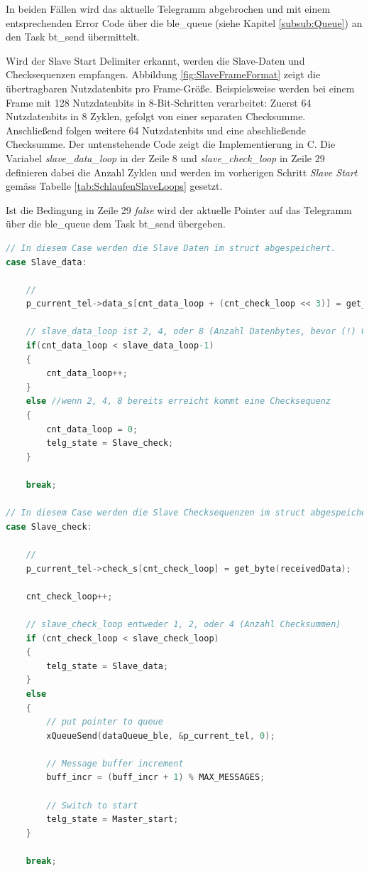 In beiden Fällen wird das aktuelle Telegramm abgebrochen und mit einem entsprechenden Error Code über die ble\_queue (siehe Kapitel \ref{subsub:Queue}) an den Task bt\_send übermittelt. 

Wird der Slave Start Delimiter erkannt, werden die Slave-Daten und Checksequenzen empfangen. Abbildung \ref{fig:SlaveFrameFormat} zeigt die übertragbaren Nutzdatenbits pro Frame-Größe. Beispielsweise werden bei einem Frame mit 128 Nutzdatenbits in 8-Bit-Schritten verarbeitet: Zuerst 64 Nutzdatenbits in 8 Zyklen, gefolgt von einer separaten Checksumme. Anschließend folgen weitere 64 Nutzdatenbits und eine abschließende Checksumme. Der untenstehende Code zeigt die Implementierung in C. Die Variabel \textit{slave\_data\_loop} in der Zeile 8 und \textit{slave\_check\_loop} in Zeile 29 definieren dabei die Anzahl Zyklen und werden im vorherigen Schritt \textit{Slave Start} gemäss Tabelle \ref{tab:SchlaufenSlaveLoops} gesetzt. 

Ist die Bedingung in Zeile 29 \textit{false} wird der aktuelle Pointer auf das Telegramm über die ble\_queue dem Task bt\_send übergeben. 


\begin{lstlisting}[language=C]
// In diesem Case werden die Slave Daten im struct abgespeichert.
case Slave_data:

    // 
    p_current_tel->data_s[cnt_data_loop + (cnt_check_loop << 3)] = get_byte(receivedData);

    // slave_data_loop ist 2, 4, oder 8 (Anzahl Datenbytes, bevor (!) Checksequenz folgt
    if(cnt_data_loop < slave_data_loop-1) 
    {
        cnt_data_loop++;
    } 
    else //wenn 2, 4, 8 bereits erreicht kommt eine Checksequenz
    {
        cnt_data_loop = 0;
        telg_state = Slave_check;
    }
    
    break;

// In diesem Case werden die Slave Checksequenzen im struct abgespeichert.
case Slave_check:

    // 
    p_current_tel->check_s[cnt_check_loop] = get_byte(receivedData);

    cnt_check_loop++;

    // slave_check_loop entweder 1, 2, oder 4 (Anzahl Checksummen)
    if (cnt_check_loop < slave_check_loop)
    {
        telg_state = Slave_data;
    } 
    else 
    {
        // put pointer to queue
        xQueueSend(dataQueue_ble, &p_current_tel, 0);

        // Message buffer increment 
        buff_incr = (buff_incr + 1) % MAX_MESSAGES;

        // Switch to start 
        telg_state = Master_start;
    }

    break;
\end{lstlisting}

